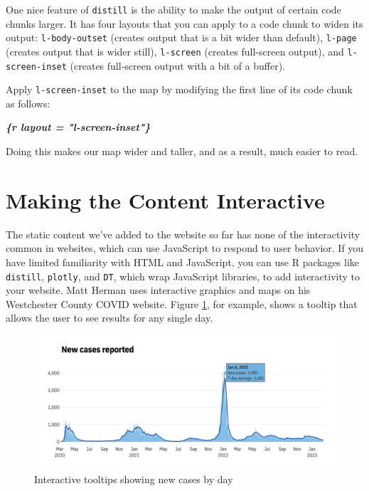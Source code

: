 \documentclass[
]{book}
\newenvironment{Shaded}{\begin{snugshade}}{\end{snugshade}}
\newcommand{\InformationTok}[1]{\textcolor[rgb]{0.56,0.35,0.01}{\textbf{\textit{#1}}}}
\begin{document}
One nice feature of \texttt{distill} is the ability to make the output of certain code chunks larger. It has four layouts that you can apply to a code chunk to widen its output: \texttt{l-body-outset} (creates output that is a bit wider than default), \texttt{l-page} (creates output that is wider still), \texttt{l-screen} (creates full-screen output), and \texttt{l-screen-inset} (creates full-screen output with a bit of a buffer).

Apply \texttt{l-screen-inset} to the map by modifying the first line of its code chunk as follows:

\begin{Shaded}
\begin{Highlighting}[]
\InformationTok{\textasciigrave{}\textasciigrave{}\textasciigrave{}\{r layout = "l{-}screen{-}inset"\}}
\end{Highlighting}
\end{Shaded}

Doing this makes our map wider and taller, and as a result, much easier to read.

\hypertarget{making-the-content-interactive}{%
\section*{Making the Content Interactive}\label{making-the-content-interactive}}

The static content we've added to the website so far has none of the interactivity common in websites, which can use JavaScript to respond to user behavior. If you have limited familiarity with HTML and JavaScript, you can use R packages like \texttt{distill}, \texttt{plotly}, and \texttt{DT}, which wrap JavaScript libraries, to add interactivity to your website. Matt Herman uses interactive graphics and maps on his Westchester County COVID website. Figure \ref{fig:westchester-website-tooltip}, for example, shows a tooltip that allows the user to see results for any single day.

\begin{figure}
\includegraphics[width=1\linewidth]{assets/westchester-website-tooltip} \caption{Interactive tooltips showing new cases by day}\label{fig:westchester-website-tooltip}
\end{figure}
\end{document}
